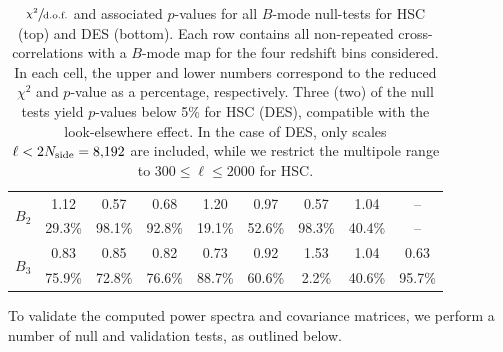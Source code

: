 \documentclass[a4paper,11pt]{article}
\newcommand{\Nside}{N_{\rm side}}
\newcommand{\dof}{\text{d.o.f.}}
\begin{document}
\begin{table}
\begin{tabular}{|l|cccccccc|}
        \hline
        \multirow{2}{*}{$B_2$} & 1.12   & 0.57   & 0.68   & 1.20   & 0.97   & 0.57   & 1.04   & -- \\
                               & 29.3\% & 98.1\% & 92.8\% & 19.1\% & 52.6\% & 98.3\% & 40.4\% & -- \\
        \hline
        \multirow{2}{*}{$B_3$} & 0.83   & 0.85   & 0.82   & 0.73   & 0.92   & 1.53  & 1.04   & 0.63   \\
                               & 75.9\% & 72.8\% & 76.6\% & 88.7\% & 60.6\% & 2.2\% & 40.6\% & 95.7\% \\
        \hline  
      \end{tabular}
      \caption{$\sfrac{\chi^2}{\dof}$ and associated $p$-values for all $B$-mode null-tests for HSC (top) and DES (bottom). Each row contains all non-repeated cross-correlations with a $B$-mode map for the four redshift bins considered. In each cell, the upper and lower numbers correspond to the reduced $\chi^2$ and $p$-value as a percentage, respectively. Three (two) of the null tests yield $p$-values below 5\% for HSC (DES), compatible with the look-elsewhere effect. In the case of DES, only scales $\ell < 2\Nside=8{,}192$ are included, while we restrict the multipole range to $300 \leq \ell \leq 2000$ for HSC.}
      \label{tab:eb_null}
      \end{table}

      To validate the computed power spectra and covariance matrices, we perform a number of null and validation tests, as outlined below.
        
\end{document}
